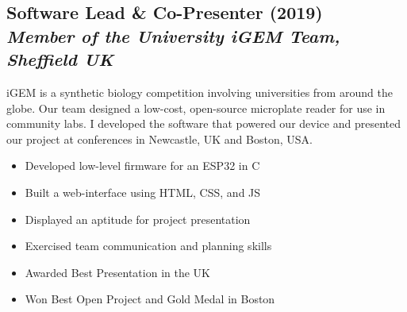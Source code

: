 \documentclass[twocolumn, a4paper, fontsize=9pt, headsepline, footsepline]{scrartcl}
\begin{document}

\subsection*{Software Lead \& Co-Presenter (2019)\\\textmd{\emph{Member of the
    University iGEM Team, Sheffield UK}}}
\noindent
iGEM is a synthetic biology competition involving universities from around the
globe. Our team designed a low-cost, open-source microplate reader for use in
community labs. I developed the software that powered our device and presented
our project at conferences in Newcastle, UK and Boston, USA.
\begin{itemize}
\item Developed low-level firmware for an ESP32 in C
\item Built a web-interface using HTML, CSS, and JS
\item Displayed an aptitude for project presentation
\item Exercised team communication and planning skills
\item Awarded Best Presentation in the UK
\item Won Best Open Project and Gold Medal in Boston
\end{itemize}
\end{document}
